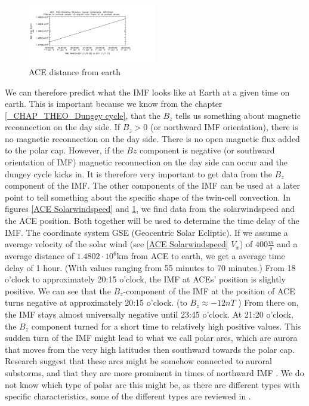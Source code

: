 \documentclass[10pt,a4paper]{article}
\begin{document}
\begin{figure}[h]
\centering
\includegraphics[width=0.5\textwidth]{ACE_distance.pdf}
\caption{ ACE distance from earth \label{ACE distance}}
\end{figure}
We can therefore predict what the IMF looks like at Earth at a given time on earth. This is important because we know from the chapter \ref{_CHAP_THEO_Dungey cycle}, that the $B_z$ 
tells us something about magnetic reconnection on the day side. If $B_z>0$ (or northward IMF orientation), there is no magnetic reconnection on the day side. 
There is no open magnetic flux added to the polar cap. However, if the $Bz$ component is negative (or southward orientation of IMF) magnetic reconnection on the day side 
can occur and the dungey cycle kicks in. It is therefore very important to get data from the $B_z$ component of the IMF. The other components of the IMF can be used at a 
later point to tell something about the specific shape of the twin-cell convection. In figures \ref{ACE Solarwindspeed} and \ref{ACE distance}, we find data from 
the solarwindspeed and the ACE position. Both together will be used to determine the time delay of the IMF. The coordinate system GSE (Geocentric Solar Ecliptic). 
If we assume a average velocity of the solar wind (see \ref{ACE Solarwindspeed} $V_x$) of $400 \frac{m}{s}$ and a average distance of $1.4802 \cdot 10^{6} \mathrm{km}$ 
from ACE to earth, we get a average time delay of 1 hour. (With values ranging from 55 minutes to 70 minutes.) From 18 o'clock to approximately 20:15 o'clock, 
the IMF at ACEs' position is slightly positive. We can see that the $B_z$-component of the IMF at the position of ACE turns negative at approximately 20:15 o'clock. 
(to $B_z\approx-12 n T$ ) From there on, the IMF stays almost universally negative until 23:45 o'clock. At 21:20 o'clock, the $B_z$ component turned for a short time 
to relatively high positive values. This sudden turn of the IMF might lead to what we call polar arcs, which are aurora that moves from the very high latitudes then 
southward towards the polar cap. Research suggest that these arcs might be somehow connected to auroral substorms, and that they are more prominent in times of northward 
IMF \cite{paper3}. We do not know which type of polar arc this might be, as there are different types with specific characteristics, some of the different types are 
reviewed in \cite{paper4}. 
\end{document}
